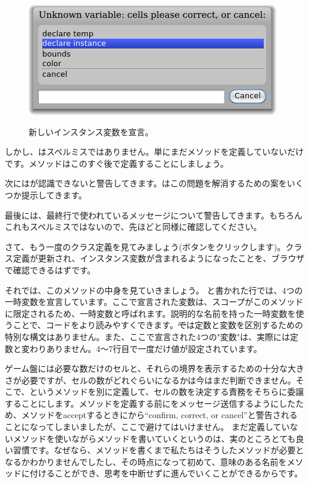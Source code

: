 \documentclass[a4paper,10pt,twoside]{book}
\begin{document}
\begin{figure}[htb]
\begin{minipage}{0.48\textwidth}
		{\includegraphics[scale=0.7]{DeclareInstanceVar}}
	\caption{新しいインスタンス変数を宣言。}
\end{minipage}
\end{figure}

しかし、はスペルミスではありません。単にまだメソッドを定義していないだけです。メソッドはこのすぐ後で定義することにしましょう。


次に\pharo はが認識できないと警告してきます。\pharo はこの問題を解消するための案をいくつか提示してきます。


最後に\pharo は、最終行で使われているメッセージについて警告してきます。もちろんこれもスペルミスではないので、先ほどと同様に確認してください。


さて、もう一度のクラス定義を見てみましょう(ボタンをクリックします)。クラス定義が更新され、インスタンス変数が含まれるようになったことを、ブラウザで確認できるはずです。

それでは、このメソッドの中身を見ていきましょう。
と書かれた行では、4つの一時変数を宣言しています。ここで宣言された変数は、スコープがこのメソッドに限定されるため、一時変数と呼ばれます。説明的な名前を持った一時変数を使うことで、コードをより読みやすくできます。\st では定数と変数を区別するための特別な構文はありません。また、ここで宣言された4つの"変数"は、実際には定数と変わりありません。4〜7行目で一度だけ値が設定されています。

ゲーム盤には必要な数だけのセルと、それらの境界を表示するための十分な大きさが必要ですが、セルの数がどれぐらいになるかは今はまだ判断できません。そこで、というメソッドを別に定義して、セルの数を決定する責務をそちらに委譲することにします。メソッドを定義する前にをメッセージ送信するようにしたため、メソッドをacceptするときに\pharo から``confirm, correct, or cancel''と警告されることになってしまいましたが、ここで避けてはいけません。
まだ定義していないメソッドを使いながらメソッドを書いていくというのは、実のところとても良い習慣です。なぜなら、メソッドを書くまで私たちはそうしたメソッドが必要となるかわかりませんでしたし、その時点になって初めて、意味のある名前をメソッドに付けることができ、思考を中断せずに進んでいくことができるからです。
\end{document}
